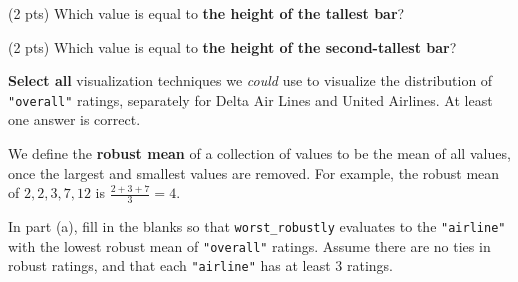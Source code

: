 \documentclass[twoside,12pt]{article}
\begin{document}
\begin{probset}
\begin{prob}[(8 pts)]
\begin{subprobset}
\begin{subprob}

\end{subprob}

\begin{subprob}(2 pts) Which value is equal to \textbf{the height of the tallest bar}?


\end{subprob}

\begin{subprob}(2 pts) Which value is equal to \textbf{the height of the second-tallest bar}?


\end{subprob}
    
\end{subprobset}
    
\end{prob}

\newpage

\begin{prob}[(4 pts)]
\textbf{Select all} visualization techniques we \textit{could} use to visualize the distribution of \texttt{"overall"} ratings, separately for Delta Air Lines and United Airlines. At least one answer is correct.





    
\end{prob}

\begin{prob}[(8 pts)]

We define the \textbf{robust mean} of a collection of values to be the mean of all values, once the largest and smallest values are removed. For example, the robust mean of $2, 2, 3, 7, 12$ is $\frac{2+3+7}{3} = 4$.

In part (a), fill in the blanks so that \texttt{worst\_robustly} evaluates to the \texttt{"airline"} with the lowest robust mean of \texttt{"overall"} ratings. Assume there are no ties in robust ratings, and that each \texttt{"airline"} has at least 3 ratings.


\end{prob}
\end{probset}
\end{document}
